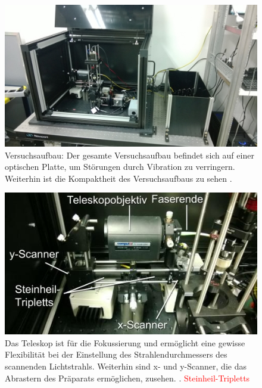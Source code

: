 \begin{figure}[H]
	\centering
\includegraphics[width=1.0\linewidth]{IMAGE/versuchsaufbau.png}
	\caption{Versuchsaufbau: Der gesamte Versuchsaufbau befindet sich auf einer optischen Platte, um Störungen durch Vibration zu verringern. Weiterhin ist die Kompaktheit des Versuchsaufbaus zu sehen \cite{Anleitung}.}
	\label{fig:versuchsaufbau}
\end{figure} 

\begin{figure}[H]
	\centering
\includegraphics[width=1.0\linewidth]{IMAGE/scanner.jpeg}
	\caption{Das Teleskop ist für die Fokussierung und ermöglicht eine gewisse Flexibilität bei der Einstellung des Strahlendurchmessers des scannenden Lichtstrahls. Weiterhin sind x- und y-Scanner, die das Abrastern des Präparats ermöglichen, zusehen. \cite{Anleitung}. \textcolor{red}{Steinheil-Tripletts}}
	\label{fig:scanner}
\end{figure}




